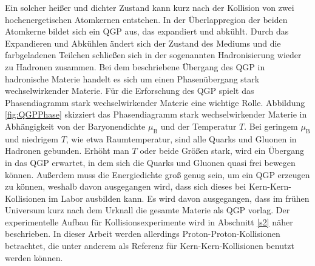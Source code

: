 \newline
Ein solcher hei{\ss}er und dichter Zustand kann kurz nach der Kollision von zwei hochenergetischen Atomkernen entstehen.
In der \"Uberlappregion der beiden Atomkerne bildet sich ein QGP aus, das expandiert und abk\"uhlt.
Durch das Expandieren und Abk\"uhlen \"andert sich der Zustand des Mediums und die farbgeladenen Teilchen schlie{\ss}en sich in der sogenannten Hadronisierung wieder zu Hadronen zusammen.
Bei dem beschriebene \"Ubergang des QGP in hadronische Materie handelt es sich um einen Phasen\"ubergang stark wechselwirkender Materie.
\newline
F\"ur die Erforschung des QGP spielt das Phasendiagramm stark wechselwirkender Materie eine wichtige Rolle.
Abbildung \ref{fig:QGPPhase} skizziert das Phasendiagramm stark wechselwirkender Materie in Abh\"angigkeit von der Baryonendichte $\mu_{\text{B}}$ und der Temperatur $T$.
Bei geringem $\mu_{\text{B}}$ und niedrigem $T$, wie etwa Raumtemperatur, sind alle Quarks und Gluonen in Hadronen gebunden.
Erh\"oht man $T$ oder beide Gr\"o{\ss}en stark, wird ein \"Ubergang in das QGP erwartet, in dem sich die Quarks und Gluonen quasi frei bewegen k\"onnen.
Au{\ss}erdem muss die Energiedichte gro{\ss} genug sein, um ein QGP erzeugen zu k\"onnen, weshalb davon ausgegangen wird, dass sich dieses bei Kern-Kern-Kollisionen im Labor ausbilden kann.
Es wird davon ausgegangen, dass im fr\"uhen Universum kurz nach dem Urknall die gesamte Materie als QGP vorlag.
\newline
Der experimentelle Aufbau f\"ur Kollisionsexperimente wird in Abschnitt \ref{s2} n\"aher beschrieben.
In dieser Arbeit werden allerdings Proton-Proton-Kollisionen betrachtet, die unter anderem als Referenz f\"ur Kern-Kern-Kollisionen benutzt werden k\"onnen. 




